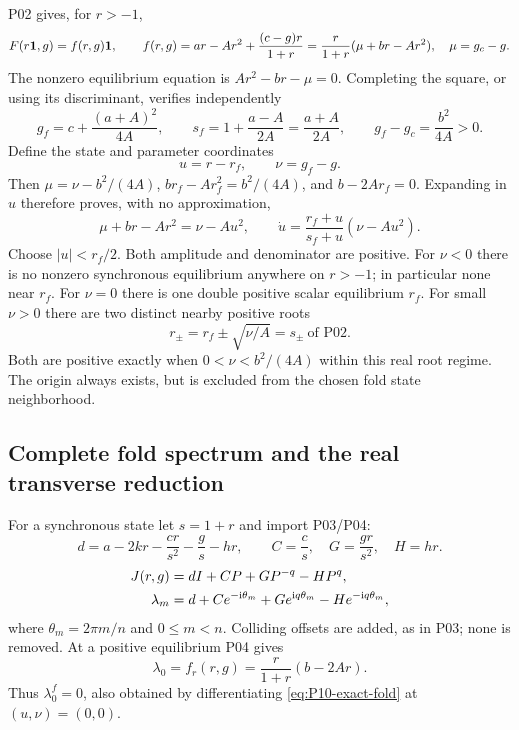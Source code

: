 P02 gives, for $r>-1$,
\begin{equation}
 F(r\mathbf{1},g)=f(r,g)\mathbf{1},\qquad
 f(r,g)=ar-Ar^2+\frac{(c-g)r}{1+r}
       =\frac r{1+r}(\mu+br-Ar^2),\quad \mu=g_c-g.
 \label{eq:P10-scalar}
\end{equation}
The nonzero equilibrium equation is $Ar^2-br-\mu=0$.
Completing the square, or using its discriminant, verifies independently
\begin{equation}
 g_f=c+\frac{(a+A)^2}{4A},\qquad
 s_f=1+\frac{a-A}{2A}=\frac{a+A}{2A},\qquad
 g_f-g_c=\frac{b^2}{4A}>0.
 \label{eq:P10-fold-identities}
\end{equation}
Define the state and parameter coordinates
\begin{equation}
 u=r-r_f,\qquad \nu=g_f-g.
 \label{eq:P10-coordinates}
\end{equation}
Then $\mu=\nu-b^2/(4A)$, $br_f-Ar_f^2=b^2/(4A)$, and
$b-2Ar_f=0$. Expanding in $u$ therefore proves, with no approximation,
\begin{equation}
 \boxed{\mu+br-Ar^2=\nu-Au^2,\qquad
 \dot u=\frac{r_f+u}{s_f+u}(\nu-Au^2).}
 \label{eq:P10-exact-fold}
\end{equation}
Choose $|u|<r_f/2$. Both amplitude and denominator are positive.
For $\nu<0$ there is no nonzero synchronous equilibrium anywhere on
$r>-1$; in particular none near $r_f$. For $\nu=0$ there is one
double positive scalar equilibrium $r_f$. For small $\nu>0$ there
are two distinct nearby positive roots
\begin{equation}
 \boxed{r_\pm=r_f\pm\sqrt{\nu/A}=s_\pm\ \text{of P02}.}
 \label{eq:P10-local-roots}
\end{equation}
Both are positive exactly when $0<\nu<b^2/(4A)$ within this real
root regime. The origin always exists, but is excluded from the
chosen fold state neighborhood.

\subsection{Complete fold spectrum and the real transverse reduction}

For a synchronous state let $s=1+r$ and import P03/P04:
\[
 d=a-2kr-\frac{cr}{s^2}-\frac gs-hr,\qquad
 C=\frac cs,\quad G=\frac{gr}{s^2},\quad H=hr.
\]
\begin{align}
 J(r,g)&=dI+CP+GP^{-q}-HP^q,\notag\\
 \lambda_m&=d+Ce^{-\mathrm{i}\theta_m}+Ge^{\mathrm{i} q\theta_m}-He^{-\mathrm{i} q\theta_m},
 \label{eq:P10-spectrum}
\end{align}
where $\theta_m=2\pi m/n$ and $0\le m<n$.
Colliding offsets are added, as in P03; none is removed.
At a positive equilibrium P04 gives
\begin{equation}
 \lambda_0=f_r(r,g)=\frac r{1+r}(b-2Ar).
 \label{eq:P10-uniform}
\end{equation}
Thus $\lambda_0^f=0$, also obtained by differentiating
\eqref{eq:P10-exact-fold} at $(u,\nu)=(0,0)$.

